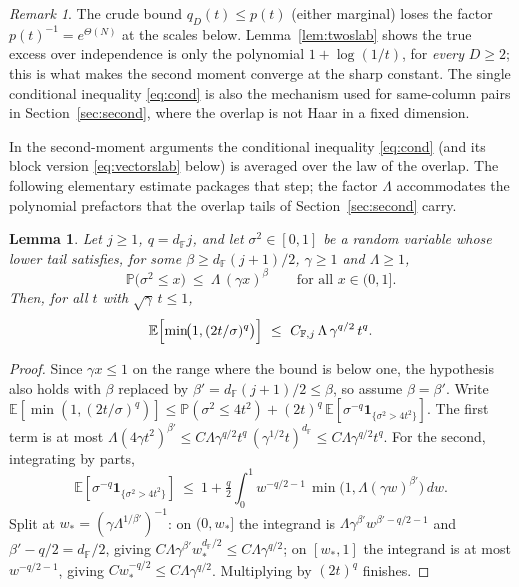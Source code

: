 \documentclass[11pt,reqno]{amsart}
\theoremstyle{plain}
\newtheorem{lemma}[theorem]{Lemma}
\theoremstyle{definition}
\theoremstyle{remark}
\newtheorem{remark}[theorem]{Remark}
\newcommand{\F}{\mathbb{F}}
\newcommand{\PP}{\mathbb{P}}
\newcommand{\EE}{\mathbb{E}}
\newcommand{\one}{\mathbf{1}}
\newcommand{\dF}{d_{\F}}
\begin{document}
\begin{remark}\label{rem:crude}
The crude bound $q_D(t)\le p(t)$ (either marginal) loses the factor $p(t)^{-1}=e^{\Theta(N)}$ at the
scales below. Lemma~\ref{lem:twoslab} shows the true excess over independence is only the polynomial
$1+\log(1/t)$, for \emph{every} $D\ge2$; this is what makes the second moment converge at the sharp
constant. The single conditional inequality \eqref{eq:cond} is also the mechanism used for
same-column pairs in Section~\ref{sec:second}, where the overlap is not Haar in a fixed dimension.
\end{remark}

In the second-moment arguments the conditional inequality \eqref{eq:cond} (and its block version
\eqref{eq:vectorslab} below) is averaged over the law of the overlap. The following elementary
estimate packages that step; the factor $\Lambda$ accommodates the polynomial prefactors that the
overlap tails of Section~\ref{sec:second} carry.

\begin{lemma}\label{lem:averaged}
Let $j\ge1$, $q=\dF j$, and let $\sigma^2\in[0,1]$ be a random variable whose lower tail satisfies,
for some $\beta\ge\dF(j+1)/2$, $\gamma\ge1$ and $\Lambda\ge1$,
\[
  \PP\bigl(\sigma^2\le x\bigr)\ \le\ \Lambda\,(\gamma x)^{\beta}\qquad\text{for all }x\in(0,1].
\]
Then, for all $t$ with $\sqrt\gamma\,t\le1$,
\[
  \EE\Bigl[\min\!\bigl(1,(2t/\sigma)^{q}\bigr)\Bigr]\ \le\ C_{\F,j}\,\Lambda\,\gamma^{q/2}\,t^{q}.
\]
\end{lemma}

\begin{proof}
Since $\gamma x\le1$ on the range where the bound is below one, the hypothesis also holds with
$\beta$ replaced by $\beta'=\dF(j+1)/2\le\beta$, so assume $\beta=\beta'$. Write
$\EE[\min(1,(2t/\sigma)^q)]\le\PP(\sigma^2\le4t^2)+(2t)^q\,\EE[\sigma^{-q}\one_{\{\sigma^2>4t^2\}}]$.
The first term is at most $\Lambda(4\gamma t^2)^{\beta'}\le C\Lambda\gamma^{q/2}t^{q}\,
(\gamma^{1/2}t)^{\dF}\le C\Lambda\gamma^{q/2}t^q$. For the second, integrating by parts,
\[
  \EE[\sigma^{-q}\one_{\{\sigma^2>4t^2\}}]\ \le\ 1+\tfrac q2\int_{0}^{1}w^{-q/2-1}\,
  \min\!\bigl(1,\Lambda(\gamma w)^{\beta'}\bigr)\,dw .
\]
Split at $w_*=(\gamma\Lambda^{1/\beta'})^{-1}$: on $(0,w_*]$ the integrand is
$\Lambda\gamma^{\beta'}w^{\beta'-q/2-1}$ and $\beta'-q/2=\dF/2$, giving
$C\Lambda\gamma^{\beta'}w_*^{\dF/2}\le C\Lambda\gamma^{q/2}$; on $[w_*,1]$ the integrand is at most
$w^{-q/2-1}$, giving $Cw_*^{-q/2}\le C\Lambda\gamma^{q/2}$. Multiplying by $(2t)^q$ finishes.
\end{proof}
\end{document}
